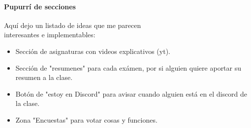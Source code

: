 \documentclass[a4paper]{article}
\begin{document}
\paragraph{Pupurrí de secciones }
Aquí dejo un listado de ideas que me parecen\\ interesantes e implementables:
\begin{itemize}
    \item Sección de asignaturas con videos explicativos (yt).
    \item Sección de "resumenes" para cada exámen, por si alguien quiere aportar su resumen a la clase.
    \item Botón de "estoy en Discord" para avisar cuando alguien está en el discord de la clase.
    \item Zona "Encuestas" para votar cosas y funciones.
\end{itemize}
\end{document}
